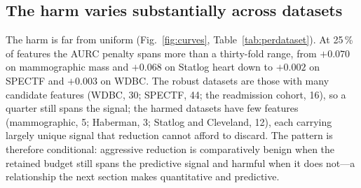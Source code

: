 \documentclass[fleqn,10pt]{wlscirep}
\newcommand{\result}[1]{#1}
\begin{document}
\begin{table}[t]
\centering
\caption{Cells (dataset, ranker, learner) in which calibration or selective reliability (ECE, Brier,
or AURC) degrades materially while AUROC does not, by retained-feature fraction. These dissociations
are infrequent and concentrated at mild reduction levels, where AUROC itself rarely changes materially.
Computed from the released per-configuration result summary.}
\label{tab:silent}

\end{table}

\subsection{The harm varies substantially across datasets}
The harm is far from uniform (Fig.~\ref{fig:curves}, Table~\ref{tab:perdataset}). At 25\,\% of
features the AURC penalty spans more than a thirty-fold range, from \result{$+0.070$} on mammographic mass and
\result{$+0.068$} on Statlog heart down to \result{$+0.002$} on SPECTF and \result{$+0.003$} on WDBC.
The robust datasets are those with many candidate features (WDBC, 30; SPECTF, 44; the readmission
cohort, 16), so a quarter still spans the signal; the harmed datasets have few features (mammographic,
5; Haberman, 3; Statlog and Cleveland, 12), each carrying largely unique signal that reduction cannot
afford to discard. The pattern is therefore conditional: aggressive reduction is comparatively benign
when the retained budget still spans the predictive signal and harmful when it does not---a relationship
the next section makes quantitative and predictive.

\begin{table}[t]
\centering
\caption{Mean paired difference versus the full-feature model at 25\,\% of features, per dataset
(averaged over rankers and learners; positive ECE/Brier/AURC values indicate degradation, as do
negative AUROC values). Computed from the released per-configuration result summary.}
\label{tab:perdataset}

\end{table}
\end{document}
